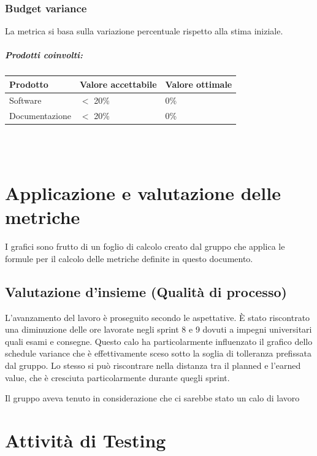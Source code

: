 \documentclass[a4paper, 12pt]{article}
\begin{document}
\subsubsection{Budget variance}
La metrica si basa sulla variazione percentuale rispetto alla stima iniziale.

\subparagraph{Prodotti coinvolti:}
\begin{center}
	\begin{tabularx}{\textwidth}{|X|X|X|}
		\hline
		\textbf{Prodotto} & \textbf{Valore accettabile } & \textbf{Valore ottimale } \\
		\hline
		Software          & $<$ 20\%                     & 0\%                       \\
		\hline
		Documentazione    & $<$ 20\%                     & 0\%                       \\
		\hline
	\end{tabularx}\\[8pt]
	\mbox{}\\
\end{center}

\section {Applicazione e valutazione delle metriche}
I grafici sono frutto di un foglio di calcolo creato dal gruppo che applica le formule per il calcolo delle metriche definite in questo documento.
\subsection{Valutazione d’insieme (Qualità di processo)}
L'avanzamento del lavoro è proseguito secondo le aspettative.
È stato riscontrato una diminuzione delle ore lavorate negli sprint 8 e 9 dovuti 
a impegni universitari quali esami e consegne. 
Questo calo ha particolarmente 
influenzato il grafico dello schedule variance che è effettivamente sceso sotto la soglia di tolleranza prefissata dal gruppo. 
Lo stesso si può riscontrare nella distanza tra il planned e l’earned value, che 
è cresciuta particolarmente durante quegli sprint. 

Il gruppo aveva tenuto in considerazione che ci sarebbe stato un calo di lavoro 


\section{Attività di Testing}
\end{document}
